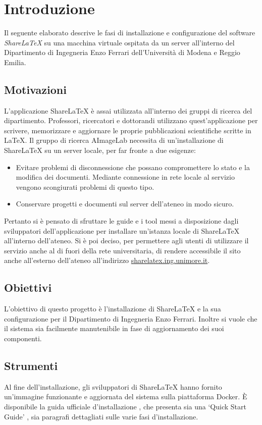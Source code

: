 \chapter{Introduzione}
\label{Introduzione}
\thispagestyle{plain}

Il seguente elaborato descrive le fasi di installazione e configurazione del software \emph{ShareLaTeX} su una macchina virtuale ospitata da un server all'interno del Dipartimento di Ingegneria Enzo Ferrari dell'Università di Modena e Reggio Emilia.

\section{Motivazioni}
L'applicazione ShareLaTeX è assai utilizzata all'interno dei gruppi di ricerca del dipartimento. Professori, ricercatori e dottorandi utilizzano quest'applicazione per scrivere, memorizzare e aggiornare le proprie pubblicazioni scientifiche scritte in \LaTeX. Il gruppo di ricerca AImageLab necessita di un'installazione di ShareLaTeX su un server locale, per far fronte a due esigenze:
\begin{itemize}
    \item Evitare problemi di disconnessione che possano compromettere lo stato e la modifica dei documenti. Mediante connessione in rete locale al servizio vengono scongiurati problemi di questo tipo.
    \item Conservare progetti e documenti sul server dell'ateneo in modo sicuro.
\end{itemize}
Pertanto si è pensato di sfruttare le guide e i tool messi a disposizione dagli sviluppatori dell'applicazione per installare un'istanza locale di ShareLaTeX all'interno dell'ateneo. Si è poi deciso, per permettere agli utenti di utilizzare il servizio anche al di fuori della rete universitaria, di rendere accessibile il sito anche all'esterno dell'ateneo all'indirizzo \url{sharelatex.ing.unimore.it}.

\section{Obiettivi}
L'obiettivo di questo progetto è l'installazione di ShareLaTeX e la sua configurazione per il Dipartimento di Ingegneria Enzo Ferrari. Inoltre si vuole che il sistema sia facilmente manutenibile in fase di aggiornamento dei suoi componenti.

\section{Strumenti}
Al fine dell'installazione, gli sviluppatori di ShareLaTeX hanno fornito un'immagine funzionante e aggiornata del sistema sulla piattaforma Docker. È disponibile la guida ufficiale d'installazione \cite{sharelatex_wiki}, che presenta sia una \enquote*{Quick Start Guide} \cite{sharelatex_qsg}, sia paragrafi dettagliati sulle varie fasi d'installazione.

